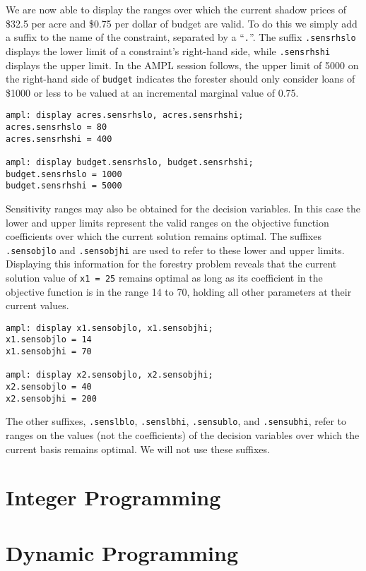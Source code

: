 \documentclass[12pt]{book}
\begin{document}
We are now able to display the ranges over which the current shadow
prices of \$32.5 per acre and \$0.75 per dollar of budget are
valid. To do this we simply add a suffix to the name of the
constraint, separated by a ``\texttt{.}''. The suffix
\texttt{.sensrhslo} displays the lower limit of a constraint's
right-hand side, while \texttt{.sensrhshi} displays the upper limit.
In the AMPL session follows, the
upper limit of 5000 on the right-hand side of \texttt{budget}
indicates the forester should only consider loans of \$1000 or less to
be valued at an incremental marginal value of 0.75.

\begin{Verbatim}[samepage=true]
ampl: display acres.sensrhslo, acres.sensrhshi;
acres.sensrhslo = 80
acres.sensrhshi = 400

ampl: display budget.sensrhslo, budget.sensrhshi;
budget.sensrhslo = 1000
budget.sensrhshi = 5000
\end{Verbatim}

Sensitivity ranges may also be obtained for the decision variables. In
this case the lower and upper limits represent the valid ranges on the
objective function coefficients over which the current solution
remains optimal.  The suffixes \texttt{.sensobjlo} and
\texttt{.sensobjhi} are used to refer to these lower and upper limits.
Displaying this information for the forestry problem reveals that the
current solution value of \texttt{x1 = 25} remains optimal as long as
its coefficient in the objective function is in the range 14 to 70,
holding all other parameters at their current values.

\begin{Verbatim}[samepage=true]
ampl: display x1.sensobjlo, x1.sensobjhi;
x1.sensobjlo = 14
x1.sensobjhi = 70

ampl: display x2.sensobjlo, x2.sensobjhi;
x2.sensobjlo = 40
x2.sensobjhi = 200
\end{Verbatim}

The other suffixes, \texttt{.senslblo}, \texttt{.senslbhi},
\texttt{.sensublo}, and \texttt{.sensubhi}, refer to ranges on the
values (not the coefficients) of the decision variables over which the
current basis remains optimal. We will not use these suffixes.

\section{Integer Programming}

\section{Dynamic Programming}
\end{document}
